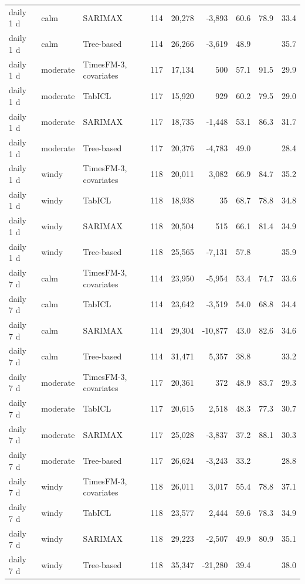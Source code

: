 \begin{tabular}{lllrrrrrr}
daily 1 d & calm & SARIMAX & 114 & 20,278 & -3,893 & 60.6 & 78.9 & 33.4 \\
daily 1 d & calm & Tree-based & 114 & 26,266 & -3,619 & 48.9 &  & 35.7 \\
daily 1 d & moderate & TimesFM-3, covariates & 117 & 17,134 & 500 & 57.1 & 91.5 & 29.9 \\
daily 1 d & moderate & TabICL & 117 & 15,920 & 929 & 60.2 & 79.5 & 29.0 \\
daily 1 d & moderate & SARIMAX & 117 & 18,735 & -1,448 & 53.1 & 86.3 & 31.7 \\
daily 1 d & moderate & Tree-based & 117 & 20,376 & -4,783 & 49.0 &  & 28.4 \\
daily 1 d & windy & TimesFM-3, covariates & 118 & 20,011 & 3,082 & 66.9 & 84.7 & 35.2 \\
daily 1 d & windy & TabICL & 118 & 18,938 & 35 & 68.7 & 78.8 & 34.8 \\
daily 1 d & windy & SARIMAX & 118 & 20,504 & 515 & 66.1 & 81.4 & 34.9 \\
daily 1 d & windy & Tree-based & 118 & 25,565 & -7,131 & 57.8 &  & 35.9 \\
daily 7 d & calm & TimesFM-3, covariates & 114 & 23,950 & -5,954 & 53.4 & 74.7 & 33.6 \\
daily 7 d & calm & TabICL & 114 & 23,642 & -3,519 & 54.0 & 68.8 & 34.4 \\
daily 7 d & calm & SARIMAX & 114 & 29,304 & -10,877 & 43.0 & 82.6 & 34.6 \\
daily 7 d & calm & Tree-based & 114 & 31,471 & 5,357 & 38.8 &  & 33.2 \\
daily 7 d & moderate & TimesFM-3, covariates & 117 & 20,361 & 372 & 48.9 & 83.7 & 29.3 \\
daily 7 d & moderate & TabICL & 117 & 20,615 & 2,518 & 48.3 & 77.3 & 30.7 \\
daily 7 d & moderate & SARIMAX & 117 & 25,028 & -3,837 & 37.2 & 88.1 & 30.3 \\
daily 7 d & moderate & Tree-based & 117 & 26,624 & -3,243 & 33.2 &  & 28.8 \\
daily 7 d & windy & TimesFM-3, covariates & 118 & 26,011 & 3,017 & 55.4 & 78.8 & 37.1 \\
daily 7 d & windy & TabICL & 118 & 23,577 & 2,444 & 59.6 & 78.3 & 34.9 \\
daily 7 d & windy & SARIMAX & 118 & 29,223 & -2,507 & 49.9 & 80.9 & 35.1 \\
daily 7 d & windy & Tree-based & 118 & 35,347 & -21,280 & 39.4 &  & 38.0 \\
\bottomrule
\end{tabular}
